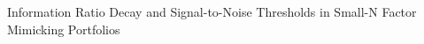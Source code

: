 \documentclass[]{article}
\begin{document}
Information Ratio Decay and Signal-to-Noise Thresholds in Small-N Factor Mimicking Portfolios
\end{document}
